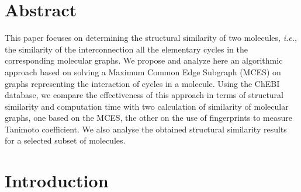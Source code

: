\documentclass[10pt,letterpaper]{article}
\begin{document}
\section*{Abstract}

This paper focuses on determining the structural similarity of two molecules, \textit{i.e.}, the similarity of the interconnection all the elementary cycles in the corresponding molecular graphs. We propose and analyze here an algorithmic approach based on solving a Maximum Common Edge Subgraph (MCES) on graphs representing the interaction of cycles in a molecule. Using the ChEBI database, we compare the effectiveness of this approach in terms of structural similarity and computation time with two calculation of similarity of molecular graphs, one based on the MCES, the other on the use of fingerprints to measure Tanimoto coefficient. We also analyse the obtained structural similarity results for a selected subset of molecules.


\linenumbers

\section*{Introduction}
\end{document}
